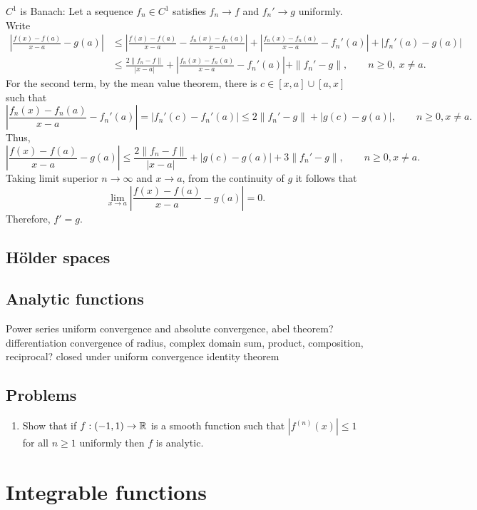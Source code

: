 \documentclass{../../large}
\begin{document}
$C^1$ is Banach:
Let a sequence $f_n\in C^1$ satisfies $f_n\to f$ and $f_n'\to g$ uniformly.
Write
\begin{align*}
\left|\frac{f(x)-f(a)}{x-a}-g(a)\right|
&\le
\left|\frac{f(x)-f(a)}{x-a}-\frac{f_n(x)-f_n(a)}{x-a}\right|
+\left|\frac{f_n(x)-f_n(a)}{x-a}-f_n'(a)\right|
+|f_n'(a)-g(a)|\\
&\le\frac{2\|f_n-f\|}{|x-a|}
+\left|\frac{f_n(x)-f_n(a)}{x-a}-f_n'(a)\right|
+\|f_n'-g\|,\qquad n\ge0,\ x\ne a.
\end{align*}
For the second term, by the mean value theorem, there is $c\in[x,a]\cup[a,x]$ such that
\[\left|\frac{f_n(x)-f_n(a)}{x-a}-f_n'(a)\right|=|f_n'(c)-f_n'(a)|\le2\|f_n'-g\|+|g(c)-g(a)|,\qquad n\ge0, x\ne a.\]
Thus,
\[\left|\frac{f(x)-f(a)}{x-a}-g(a)\right|\le\frac{2\|f_n-f\|}{|x-a|}+|g(c)-g(a)|+3\|f_n'-g\|,\qquad n\ge0, x\ne a.\]
Taking limit superior $n\to\infty$ and $x\to a$, from the continuity of $g$ it follows that
\[\lim_{x\to a}\left|\frac{f(x)-f(a)}{x-a}-g(a)\right|=0.\]
Therefore, $f'=g$.

\section{H\"older spaces}

\section{Analytic functions}

Power series
uniform convergence and absolute convergence, abel theorem?
differentiation
convergence of radius, complex domain
sum, product, composition, reciprocal?
closed under uniform convergence
identity theorem


\section*{Problems}

	
\begin{enumerate}
\item Show that if $f:(-1,1)\to\mathbb{R}$ is a smooth function such that $|f^{(n)}(x)|\le1$ for all $n\ge1$ uniformly then $f$ is analytic.
\end{enumerate}


\chapter{Integrable functions}
\section{}
\end{document}
